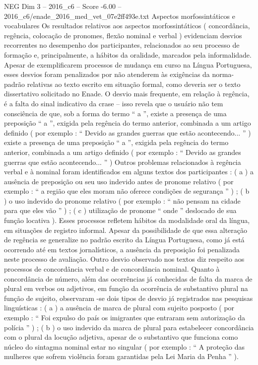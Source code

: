 \begin{textsample}{NEG Dim 3 – 2016\_c6 – Score -6.00 – 2016\_c6/enade\_2016\_med\_vet\_07e2ff493e.txt}
Aspectos morfossintáticos e vocabulares Os resultados relativos aos aspectos morfossintáticos ( concordância, regência, colocação de pronomes, flexão nominal e verbal ) evidenciam desvios recorrentes no desempenho dos participantes, relacionados ao seu processo de formação e, principalmente, a hábitos da oralidade, marcados pela informalidade.
Apesar de exemplificarem processos de mudança em curso na Língua Portuguesa, esses desvios foram penalizados por não atenderem às exigências da norma-padrão relativas ao texto escrito em situação formal, como deveria ser o texto dissertativo solicitado no Enade.
O desvio mais frequente, em relação à regência, é a falta do sinal indicativo da crase – isso revela que o usuário não tem consciência de que, sob a forma do termo “ a ”, existe a presença de uma preposição “ a ”, exigida pela regência do termo anterior, combinada a um artigo definido ( por exemplo : “ Devido as grandes guerras que estão acontecendo... ” ) existe a presença de uma preposição “ a ”, exigida pela regência do termo anterior, combinada a um artigo definido ( por exemplo : “ Devido as grandes guerras que estão acontecendo... ” ) Outros problemas relacionados à regência verbal e à nominal foram identificados em alguns textos dos participantes : ( a ) a ausência de preposição ou seu uso indevido antes de pronome relativo ( por exemplo : “ a região que eles moram não oferece condições de segurança ” ) ; ( b ) o uso indevido do pronome relativo ( por exemplo : “ não pensam na cidade para que eles vão ” ) ; ( c ) utilização de pronome “ onde ” deslocado de sua função locativa ).
Esses processos refletem hábitos da modalidade oral da língua, em situações de registro informal.
Apesar da possibilidade de que essa alteração de regência se generalize no padrão escrito da Língua Portuguesa, como já está ocorrendo até em textos jornalísticos, a ausência da preposição foi penalizada neste processo de avaliação.
Outro desvio observado nos textos diz respeito aos processos de concordância verbal e de concordância nominal.
Quanto à concordância de número, além das ocorrências já conhecidas de falta da marca de plural em verbos ou adjetivos, em função da ocorrência de substantivo plural na função de sujeito, observaram -se dois tipos de desvio já registrados nas pesquisas linguísticas : ( a ) a ausência de marca de plural com sujeito posposto ( por exemplo : “ Foi expulso do país os imigrantes que entraram sem autorização da polícia ” ) ; ( b ) o uso indevido da marca de plural para estabelecer concordância com o plural da locução adjetiva, apesar de o substantivo que funciona como núcleo do sintagma nominal estar no singular ( por exemplo : “ A proteção das mulheres que sofrem violência foram garantidas pela Lei Maria da Penha ” ).

\end{textsample}
